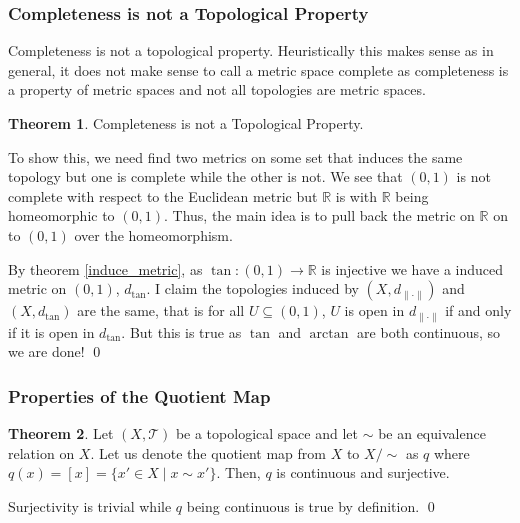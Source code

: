 \documentclass[
]{article}
\theoremstyle{definition}
\newtheorem{theorem}{Theorem}
\theoremstyle{definition}
\begin{document}
\hypertarget{completeness-is-not-a-topological-property}{%
\subsubsection{Completeness is not a Topological
Property}\label{completeness-is-not-a-topological-property}}

Completeness is not a topological property. Heuristically this makes
sense as in general, it does not make sense to call a metric space
complete as completeness is a property of metric spaces and not all
topologies are metric spaces.

\begin{theorem}
  Completeness is not a Topological Property.
\end{theorem}
\proof

To show this, we need find two metrics on some set that induces the same
topology but one is complete while the other is not. We see that
\((0, 1)\) is not complete with respect to the Euclidean metric but
\(\mathbb{R}\) is with \(\mathbb{R}\) being homeomorphic to \((0, 1)\).
Thus, the main idea is to pull back the metric on \(\mathbb{R}\) on to
\((0, 1)\) over the homeomorphism.

By theorem \ref{induce_metric}, as \(\tan : (0, 1) \to \mathbb{R}\) is
injective we have a induced metric on \((0, 1)\), \(d_{\tan}\). I claim
the topologies induced by \((X, d_{\| \cdot \|})\) and \((X, d_{\tan})\)
are the same, that is for all \(U \subseteq (0, 1)\), \(U\) is open in
\(d_{\| \cdot \|}\) if and only if it is open in \(d_{\tan}\). But this
is true as \(\tan\) and \(\arctan\) are both continuous, so we are done!
\qed

\hypertarget{properties-of-the-quotient-map}{%
\subsubsection{Properties of the Quotient
Map}\label{properties-of-the-quotient-map}}

\begin{theorem}
  Let \((X, \mathcal{T})\) be a topological space and let \(\sim\) be an equivalence 
  relation on \(X\). Let us denote the quotient map from \(X\) to \(X / \sim\) as 
  \(q\) where \(q(x) = [x] = \{x' \in X \mid x \sim x'\}\). Then, \(q\) is continuous
  and surjective.
\end{theorem}
\proof

Surjectivity is trivial while \(q\) being continuous is true by
definition. \qed
\end{document}
